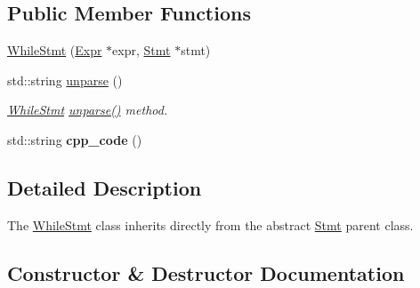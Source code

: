 \subsection*{Public Member Functions}
\begin{DoxyCompactItemize}
\item 
\hyperlink{classfcal_1_1ast_1_1WhileStmt_ab149c5fc139622ea7f4d56f64563049b}{While\+Stmt} (\hyperlink{classfcal_1_1ast_1_1Expr}{Expr} $\ast$expr, \hyperlink{classfcal_1_1ast_1_1Stmt}{Stmt} $\ast$stmt)
\item 
std\+::string \hyperlink{classfcal_1_1ast_1_1WhileStmt_af8c98bdb02459b303307a99573b57b07}{unparse} ()
\begin{DoxyCompactList}\small\item\em \hyperlink{classfcal_1_1ast_1_1WhileStmt}{While\+Stmt} \hyperlink{classfcal_1_1ast_1_1WhileStmt_af8c98bdb02459b303307a99573b57b07}{unparse()} method. \end{DoxyCompactList}\item 
std\+::string {\bfseries cpp\+\_\+code} ()\hypertarget{classfcal_1_1ast_1_1WhileStmt_a3d3d3cbb94c920541670333dfcd0570a}{}\label{classfcal_1_1ast_1_1WhileStmt_a3d3d3cbb94c920541670333dfcd0570a}

\end{DoxyCompactItemize}


\subsection{Detailed Description}
The \hyperlink{classfcal_1_1ast_1_1WhileStmt}{While\+Stmt} class inherits directly from the abstract \hyperlink{classfcal_1_1ast_1_1Stmt}{Stmt} parent class. 

\subsection{Constructor \& Destructor Documentation}

